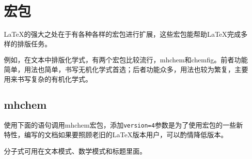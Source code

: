 {\let\clearpage\relax \chapter{宏包}}

\LaTeX 的强大之处在于有各种各样的宏包进行扩展，这些宏包能帮助\LaTeX 完成多样的排版任务。

例如，在文本中排版化学式，有两个宏包比较流行，mhchem和chemfig。前者功能简单，用法也简单，书写无机化学式首选；后者功能众多，用法也较为繁复，主要用来书写复杂的有机化学式。

\section{mhchem}

使用下面的语句调用mhchem宏包，添加\lstinline|version=4|参数是为了使用宏包的一些新特性，编写的文档如果要照顾老旧的\LaTeX 版本用户，可以酌情降低版本。

\begin{latex}
\usepackage[version=4]{mhchem}
\end{latex}


\begin{codeshow}
\par
{}
\end{codeshow}


分子式可用在文本模式、数学模式和标题里面。

\begin{codeshow}
\par
{}
 \end{codeshow}


\begin{codeshow}
\par
{}\par
\ce{[AgCl2]-}\par
{}\par
{}
\end{codeshow}


\begin{codeshow}
\end{codeshow}


\begin{codeshow}
\par
{}\par
{}\par
{}\par
{}\par
{}
\end{codeshow}

